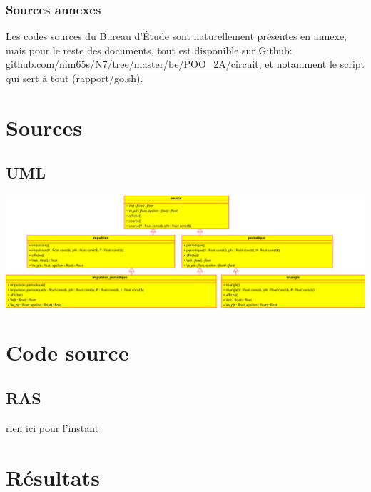 \documentclass{report}
\begin{document}
\subsection{Sources annexes}
Les codes sources du Bureau d’Étude sont naturellement présentes en annexe, mais pour le reste des documents, 
tout est disponible sur Github: \url{github.com/nim65s/N7/tree/master/be/POO_2A/circuit}, et 
notamment le script qui sert à tout (rapport/go.sh).

\chapter{Sources}
\section{UML}
\includegraphics[width=\linewidth]{images/sources}

\appendix
\chapter{Code source}
\section{RAS}
rien ici pour l’instant

\chapter{Résultats}

\end{document}
